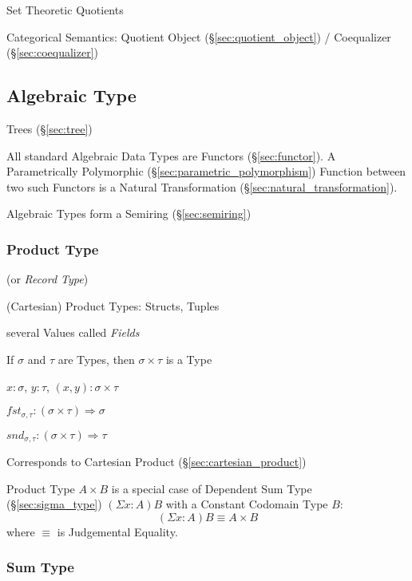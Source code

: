 Set Theoretic Quotients

Categorical Semantics: Quotient Object (\S\ref{sec:quotient_object}) /
Coequalizer (\S\ref{sec:coequalizer})



\subsection{Algebraic Type}\label{sec:algebraic_type}

Trees (\S\ref{sec:tree})

All standard Algebraic Data Types are Functors (\S\ref{sec:functor}).
A Parametrically Polymorphic (\S\ref{sec:parametric_polymorphism})
Function between two such Functors is a Natural Transformation
(\S\ref{sec:natural_transformation}).

Algebraic Types form a Semiring (\S\ref{sec:semiring})



\subsubsection{Product Type}\label{sec:product_type}

(or \emph{Record Type})

(Cartesian) Product Types: Structs, Tuples

several Values called \emph{Fields}

If $\sigma$ and $\tau$ are Types, then $\sigma \times \tau$ is a Type

$x : \sigma$, $y : \tau$, $(x,y) : \sigma \times \tau$

$fst_{\sigma,\tau} : (\sigma \times \tau) \Rightarrow \sigma$

$snd_{\sigma,\tau} : (\sigma \times \tau) \Rightarrow \tau$

Corresponds to Cartesian Product (\S\ref{sec:cartesian_product})

Product Type $A \times B$ is a special case of Dependent Sum Type
(\S\ref{sec:sigma_type}) $(\Sigma x:A)B$ with a Constant Codomain
Type $B$:
\[
  (\Sigma x:A) B \equiv A \times B
\]
where $\equiv$ is Judgemental Equality.



\subsubsection{Sum Type}\label{sec:sum_type}

